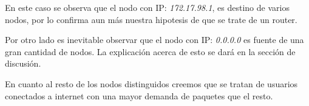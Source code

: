 En este caso se observa que el nodo con IP: \textit{172.17.98.1}, es destino de varios nodos, por lo confirma aun más nuestra hipotesis de que se trate de un router.

Por otro lado es inevitable observar que el nodo con IP: \textit{0.0.0.0} es fuente de una gran cantidad de nodos. La explicación acerca de esto se dará en la sección de discusión.

En cuanto al resto de los nodos distinguidos creemos que se tratan de usuarios conectados a internet con una mayor demanda de paquetes que el resto.